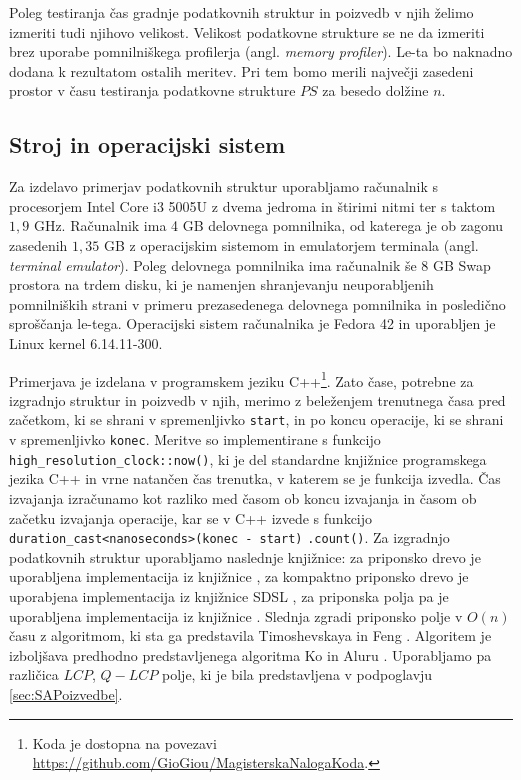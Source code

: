 Poleg testiranja čas gradnje podatkovnih struktur in poizvedb v njih želimo izmeriti tudi njihovo velikost. Velikost podatkovne strukture se ne da izmeriti brez uporabe pomnilniškega profilerja (angl. \textit{memory profiler}). Le-ta bo naknadno dodana k rezultatom ostalih meritev. Pri tem bomo merili največji zasedeni prostor v času testiranja podatkovne strukture $PS$ za besedo dolžine $n$.

\subsection{Stroj in operacijski sistem}
Za izdelavo primerjav podatkovnih struktur uporabljamo računalnik s procesorjem Intel Core i3 5005U z dvema jedroma in štirimi nitmi ter s taktom $1,9$ GHz. Računalnik ima 4 GB delovnega pomnilnika, od katerega je ob zagonu zasedenih $1,35$ GB z operacijskim sistemom in emulatorjem terminala (angl. \textit{terminal emulator}). Poleg delovnega pomnilnika ima računalnik še $8$ GB Swap prostora na trdem disku, ki je namenjen shranjevanju neuporabljenih pomnilniških strani v primeru prezasedenega delovnega pomnilnika in posledično sproščanja le-tega. Operacijski sistem računalnika je Fedora 42 in uporabljen je Linux kernel 6.14.11-300.

Primerjava je izdelana v programskem jeziku C++\footnote{Koda je dostopna na povezavi \url{https://github.com/GioGiou/MagisterskaNalogaKoda}.}. Zato čase, potrebne za izgradnjo struktur in poizvedb v njih, merimo z beleženjem trenutnega časa pred začetkom, ki se shrani v spremenljivko \verb|start|, in po koncu operacije, ki se shrani v spremenljivko \verb|konec|. Meritve so implementirane s funkcijo \verb|high_resolution_clock::now()|, ki je del standardne knjižnice programskega jezika C++ in vrne natančen čas trenutka, v katerem se je funkcija izvedla. Čas izvajanja izračunamo kot razliko med časom ob koncu izvajanja in časom ob začetku izvajanja operacije, kar se v C++ izvede s funkcijo \verb|duration_cast<nanoseconds>(konec - start)| \verb|.count()|. Za izgradnjo podatkovnih struktur uporabljamo naslednje knjižnice: za priponsko drevo je uporabljena implementacija iz knjižnice \cite{ganeshk13}, za  kompaktno priponsko drevo je uporabjena implementacija iz knjižnice SDSL \cite{gbmp2014sea}, za priponska polja pa je uporabljena implementacija iz knjižnice \cite{Grebnov2025}. Slednja zgradi priponsko polje v $O(n)$ času z algoritmom, ki sta ga predstavila Timoshevskaya in Feng \cite{Timoshevskaya2014}. Algoritem je izboljšava predhodno predstavljenega algoritma Ko in Aluru \cite{Ko2005}. Uporabljamo pa različica $LCP$, $Q-LCP$ polje, ki je bila predstavljena v podpoglavju \ref{sec:SAPoizvedbe}.

